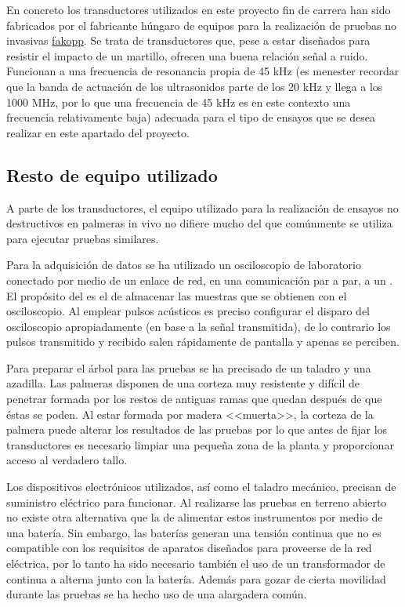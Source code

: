 En concreto los transductores utilizados en este proyecto fin de carrera
han sido fabricados por el fabricante húngaro de equipos para la
realización de pruebas no invasivas
\href{http://www.fakopp.com/site/piezo}{fakopp}. Se trata de transductores que,
pese a estar diseñados para resistir el impacto de un martillo, ofrecen una
buena relación señal a ruido. Funcionan a una frecuencia de resonancia
propia de 45 kHz (es menester recordar que la banda de actuación de los
ultrasonidos parte de los 20 kHz y llega a los 1000 MHz, por lo que una
frecuencia de 45 kHz es en este contexto una frecuencia relativamente
baja) adecuada para el tipo de ensayos que se desea realizar en este
apartado del proyecto.


\subsection{Resto de equipo utilizado}

A parte de los transductores, el equipo utilizado para la realización de
ensayos no destructivos en palmeras in vivo no difiere mucho del que
comúnmente se utiliza para ejecutar pruebas similares.

Para la adquisición de datos se ha utilizado un osciloscopio de laboratorio
conectado por medio de un enlace de red, en una comunicación par a par, a
un . El propósito del  es el de almacenar las muestras que
se obtienen con el osciloscopio. Al emplear pulsos acústicos es preciso
configurar el disparo del osciloscopio apropiadamente (en base a la señal
transmitida), de lo contrario los pulsos transmitido y recibido salen
rápidamente de pantalla y apenas se perciben.

Para preparar el árbol para las pruebas se ha precisado de un taladro y una
azadilla. Las palmeras disponen de una corteza muy resistente y difícil de
penetrar formada por los restos de antiguas ramas que quedan después de que
éstas se poden. Al estar formada por madera <<muerta>>, la corteza de la
palmera puede alterar los resultados de las pruebas por lo que antes de
fijar los transductores es necesario limpiar una pequeña zona de la planta
y proporcionar acceso al verdadero tallo.

Los dispositivos electrónicos utilizados, así como el taladro mecánico,
precisan de suministro eléctrico para funcionar. Al realizarse las pruebas
en terreno abierto no existe otra alternativa que la de alimentar estos
instrumentos por medio de una batería. Sin embargo, las baterías generan
una tensión continua que no es compatible con los requisitos de aparatos
diseñados para proveerse de la red eléctrica, por lo tanto ha sido
necesario también el uso de un transformador de continua a alterna junto
con la batería. Además para gozar de cierta movilidad durante las pruebas
se ha hecho uso de una alargadera común.

